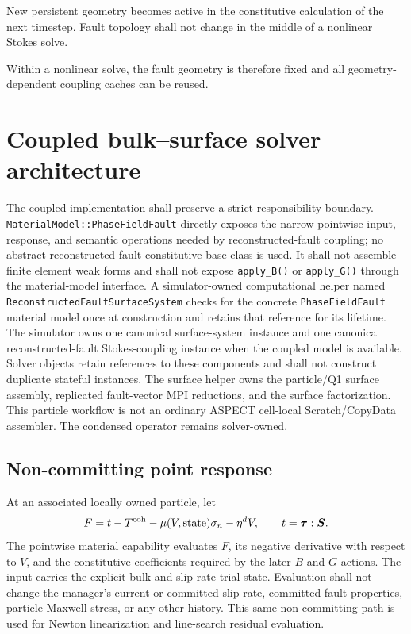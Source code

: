 \documentclass[11pt]{article}
\begin{document}
New persistent geometry becomes active in the constitutive calculation of the next timestep.  Fault topology shall not change in the middle of a nonlinear Stokes solve.

Within a nonlinear solve, the fault geometry is therefore fixed and all geometry-dependent coupling caches can be reused.

\section{Coupled bulk--surface solver architecture}

The coupled implementation shall preserve a strict responsibility boundary.
\texttt{MaterialModel::PhaseFieldFault} directly exposes the narrow pointwise
input, response, and semantic operations needed by reconstructed-fault
coupling; no abstract reconstructed-fault constitutive base class is used.  It
shall not assemble finite element weak forms and shall not expose
\texttt{apply\_B()} or \texttt{apply\_G()} through the material-model
interface.  A simulator-owned computational helper named
\texttt{ReconstructedFaultSurfaceSystem} checks for the concrete
\texttt{PhaseFieldFault} material model once at construction and retains that
reference for its lifetime.  The simulator owns one canonical surface-system
instance and one canonical reconstructed-fault Stokes-coupling instance when
the coupled model is available.  Solver objects retain references to these
components and shall not construct duplicate stateful instances.  The surface
helper owns the particle/Q1 surface assembly,
replicated fault-vector MPI reductions, and the surface factorization.  This
particle workflow is not an ordinary ASPECT cell-local Scratch/CopyData
assembler.  The condensed operator remains solver-owned.

\subsection{Non-committing point response}

At an associated locally owned particle, let
\begin{equation}
 F=t-T^{\rm coh}-\mu(V,\text{state})\sigma_n-\eta^d V,
 \qquad
 t=\boldsymbol\tau:\boldsymbol S.
\end{equation}
The pointwise material capability evaluates $F$, its negative derivative with
respect to $V$, and the constitutive coefficients required by the later $B$
and $G$ actions.  The input carries the explicit bulk and slip-rate trial
state.  Evaluation shall not change the manager's current or committed slip
rate, committed fault properties, particle Maxwell stress, or any other
history.  This same non-committing path is used for Newton linearization and
line-search residual evaluation.
\end{document}
